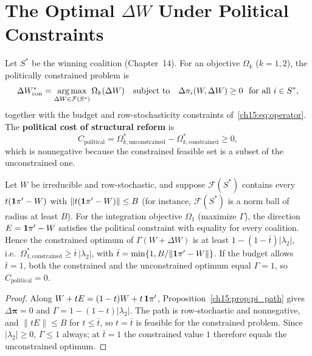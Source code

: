 \documentclass[../structural_economics_book.tex]{subfiles}
\begin{document}
\section{The Optimal $\Delta W$ Under Political Constraints}
\label{ch15:sec:political}

\begin{definition}\label{ch15:thm:political}
Let $S^*$ be the winning coalition (Chapter~14). For an objective $\Omega_k$ ($k = 1, 2$), the politically constrained problem is
\begin{equation}\label{ch15:eq:political_optimal}
\Delta W^*_{\text{con}} = \operatorname*{arg\,max}_{\Delta W \in \mathcal{F}(S^*)} \Omega_k(\Delta W) \quad \text{subject to} \quad \Delta\pi_i(W, \Delta W) \geq 0 \ \text{ for all } i \in S^*,
\end{equation}
together with the budget and row-stochasticity constraints of~\eqref{ch15:eq:operator}. The \textbf{political cost of structural reform} is
\begin{equation}\label{ch15:eq:political_cost}
C_{\text{political}} = \Omega^*_{k,\text{unconstrained}} - \Omega^*_{k,\text{constrained}} \geq 0,
\end{equation}
which is nonnegative because the constrained feasible set is a subset of the unconstrained one.
\end{definition}

\begin{proposition}\label{ch15:prop:political_cost}
Let $W$ be irreducible and row-stochastic, and suppose $\mathcal{F}(S^*)$ contains every $t(\mathbf{1}\pi' - W)$ with $\|t(\mathbf{1}\pi' - W)\| \leq B$ (for instance, $\mathcal{F}(S^*)$ is a norm ball of radius at least $B$). For the integration objective $\Omega_1$ (maximize $\Gamma$), the direction $E = \mathbf{1}\pi' - W$ satisfies the political constraint with equality for every coalition. Hence the constrained optimum of $\Gamma(W + \Delta W)$ is at least $1 - (1 - \bar t)|\lambda_2|$, i.e.\ $\Omega^*_{1,\text{constrained}} \geq \bar t\,|\lambda_2|$, with $\bar t = \min\{1, B/\|\mathbf{1}\pi' - W\|\}$. If the budget allows $\bar t = 1$, both the constrained and the unconstrained optimum equal $\Gamma = 1$, so $C_{\text{political}} = 0$.
\end{proposition}

\begin{proof}
Along $W + tE = (1-t)W + t\,\mathbf{1}\pi'$, Proposition~\ref{ch15:prop:pi_path} gives $\Delta\boldsymbol{\pi} = 0$ and $\Gamma = 1 - (1-t)|\lambda_2|$. The path is row-stochastic and nonnegative, and $\|tE\| \leq B$ for $t \leq \bar t$, so $t = \bar t$ is feasible for the constrained problem. Since $|\lambda_2| \geq 0$, $\Gamma \leq 1$ always; at $\bar t = 1$ the constrained value $1$ therefore equals the unconstrained optimum.
\end{proof}
\end{document}
